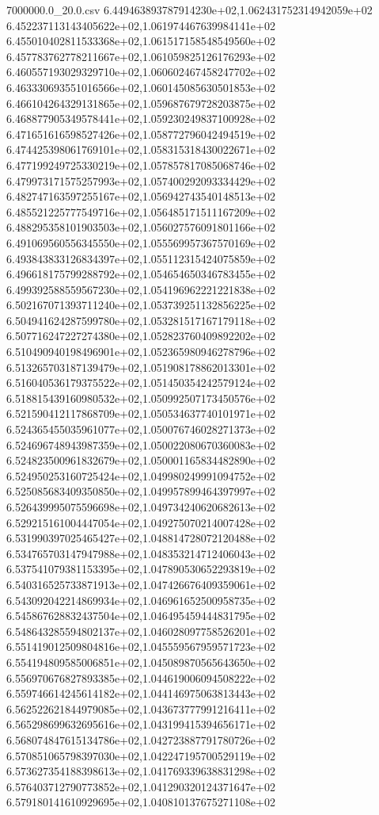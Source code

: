 \begin{filecontents*}{7000000.0_20.0.csv}
6.449463893787914230e+02,1.062431752314942059e+02
6.452237113143405622e+02,1.061974467639984141e+02
6.455010402811533368e+02,1.061517158548549560e+02
6.457783762778211667e+02,1.061059825126176293e+02
6.460557193029329710e+02,1.060602467458247702e+02
6.463330693551016566e+02,1.060145085630501853e+02
6.466104264329131865e+02,1.059687679728203875e+02
6.468877905349578441e+02,1.059230249837100928e+02
6.471651616598527426e+02,1.058772796042494519e+02
6.474425398061769101e+02,1.058315318430022671e+02
6.477199249725330219e+02,1.057857817085068746e+02
6.479973171575257993e+02,1.057400292093334429e+02
6.482747163597255167e+02,1.056942743540148513e+02
6.485521225777549716e+02,1.056485171511167209e+02
6.488295358101903503e+02,1.056027576091801166e+02
6.491069560556345550e+02,1.055569957367570169e+02
6.493843833126834397e+02,1.055112315424075859e+02
6.496618175799288792e+02,1.054654650346783455e+02
6.499392588559567230e+02,1.054196962221221838e+02
6.502167071393711240e+02,1.053739251132856225e+02
6.504941624287599780e+02,1.053281517167179118e+02
6.507716247227274380e+02,1.052823760409892202e+02
6.510490940198496901e+02,1.052365980946278796e+02
6.513265703187139479e+02,1.051908178862013301e+02
6.516040536179375522e+02,1.051450354242579124e+02
6.518815439160980532e+02,1.050992507173450576e+02
6.521590412117868709e+02,1.050534637740101971e+02
6.524365455035961077e+02,1.050076746028271373e+02
6.524696748943987359e+02,1.050022080670360083e+02
6.524823500961832679e+02,1.050001165834482890e+02
6.524950253160725424e+02,1.049980249991094752e+02
6.525085683409350850e+02,1.049957899464397997e+02
6.526439995075596698e+02,1.049734240620682613e+02
6.529215161004447054e+02,1.049275070214007428e+02
6.531990397025465427e+02,1.048814728072120488e+02
6.534765703147947988e+02,1.048353214712406043e+02
6.537541079381153395e+02,1.047890530652293819e+02
6.540316525733871913e+02,1.047426676409359061e+02
6.543092042214869934e+02,1.046961652500958735e+02
6.545867628832437504e+02,1.046495459444831795e+02
6.548643285594802137e+02,1.046028097758526201e+02
6.551419012509804816e+02,1.045559567959571723e+02
6.554194809585006851e+02,1.045089870565643650e+02
6.556970676827893385e+02,1.044619006094508222e+02
6.559746614245614182e+02,1.044146975063813443e+02
6.562522621844979085e+02,1.043673777991216411e+02
6.565298699632695616e+02,1.043199415394656171e+02
6.568074847615134786e+02,1.042723887791780726e+02
6.570851065798397030e+02,1.042247195700529119e+02
6.573627354188398613e+02,1.041769339638831298e+02
6.576403712790773852e+02,1.041290320124371647e+02
6.579180141610929695e+02,1.040810137675271108e+02

\end{filecontents*}
